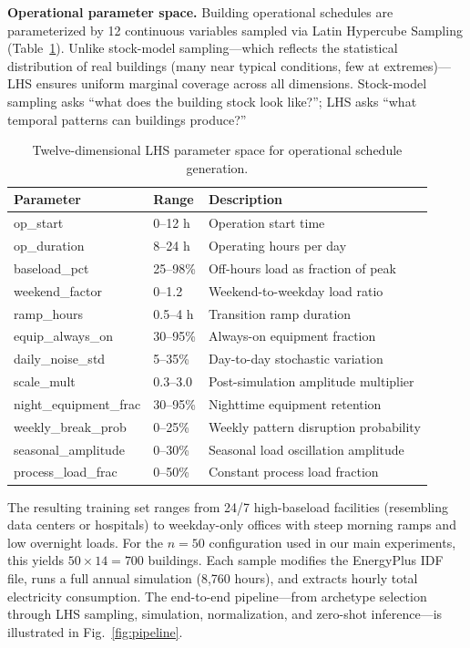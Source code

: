 \documentclass[preprint,12pt,authoryear]{elsarticle}
\begin{document}
\textbf{Operational parameter space.} Building operational schedules are parameterized by 12 continuous variables sampled via Latin Hypercube Sampling \citep{McKay1979} (Table~\ref{tab:lhs_params}). Unlike stock-model sampling---which reflects the statistical distribution of real buildings (many near typical conditions, few at extremes)---LHS ensures uniform marginal coverage across all dimensions. Stock-model sampling asks ``what does the building stock look like?''; LHS asks ``what temporal patterns can buildings produce?''

\begin{table}[htbp]
\caption{Twelve-dimensional LHS parameter space for operational schedule generation.}
\label{tab:lhs_params}
\centering
\begin{tabular}{lll}
\toprule
Parameter & Range & Description \\
\midrule
op\_start & 0--12 h & Operation start time \\
op\_duration & 8--24 h & Operating hours per day \\
baseload\_pct & 25--98\% & Off-hours load as fraction of peak \\
weekend\_factor & 0--1.2 & Weekend-to-weekday load ratio \\
ramp\_hours & 0.5--4 h & Transition ramp duration \\
equip\_always\_on & 30--95\% & Always-on equipment fraction \\
daily\_noise\_std & 5--35\% & Day-to-day stochastic variation \\
scale\_mult & 0.3--3.0 & Post-simulation amplitude multiplier \\
night\_equipment\_frac & 30--95\% & Nighttime equipment retention \\
weekly\_break\_prob & 0--25\% & Weekly pattern disruption probability \\
seasonal\_amplitude & 0--30\% & Seasonal load oscillation amplitude \\
process\_load\_frac & 0--50\% & Constant process load fraction \\
\bottomrule
\end{tabular}
\end{table}

The resulting training set ranges from 24/7 high-baseload facilities (resembling data centers or hospitals) to weekday-only offices with steep morning ramps and low overnight loads. For the $n = 50$ configuration used in our main experiments, this yields $50 \times 14 = 700$ buildings. Each sample modifies the EnergyPlus IDF file, runs a full annual simulation (8,760 hours), and extracts hourly total electricity consumption. The end-to-end pipeline---from archetype selection through LHS sampling, simulation, normalization, and zero-shot inference---is illustrated in Fig.~\ref{fig:pipeline}.
\end{document}

